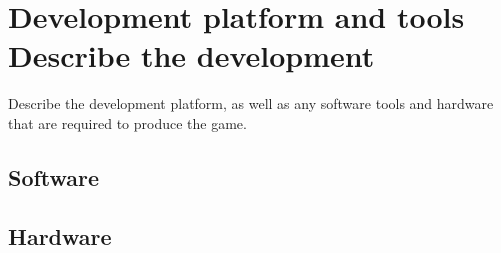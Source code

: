 \section{Development platform and tools Describe the development} %
Describe the development platform, as well as any software tools and hardware that are required to produce the game.
\subsection{Software} %

\subsection{Hardware} %